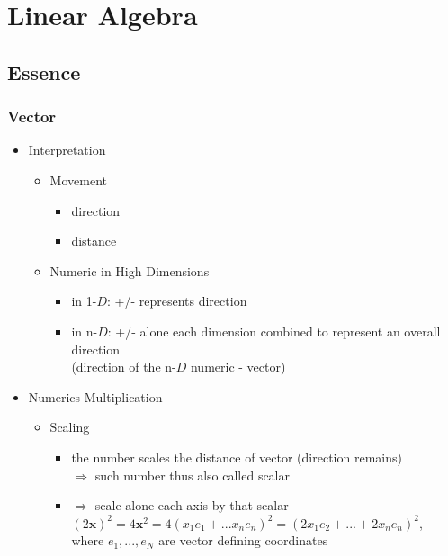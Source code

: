 \section{Linear Algebra}

\subsection{Essence}
\subsubsection{Vector}
\begin{itemize}
\item Interpretation
	\begin{itemize}
	\item Movement
		\begin{itemize}
		\item direction
		\item distance
		\end{itemize}
	\item Numeric in High Dimensions
		\begin{itemize}
		\item in 1-$D$: +/- represents direction
		\item in n-$D$: +/- alone each dimension combined to represent an overall direction \\
			(direction of the n-$D$ numeric - vector)
		\end{itemize}
	\end{itemize}

\item Numerics Multiplication
	\begin{itemize}
	\item Scaling
		\begin{itemize}
		\item the number scales the distance of vector (direction remains) \\
			$\Rightarrow$ such number thus also called scalar
		\item $\Rightarrow$ scale alone each axis by that scalar \\
			$(2\mathbf x)^2 = 4\mathbf x^2 = 4 (x_1 e_1 + ... x_ne_n)^2 = (2x_1e_2+...+2x_ne_n)^2$, \\ 
			where $e_1,...,e_N$ are vector defining coordinates
		\end{itemize}
	\end{itemize}


\end{itemize}
